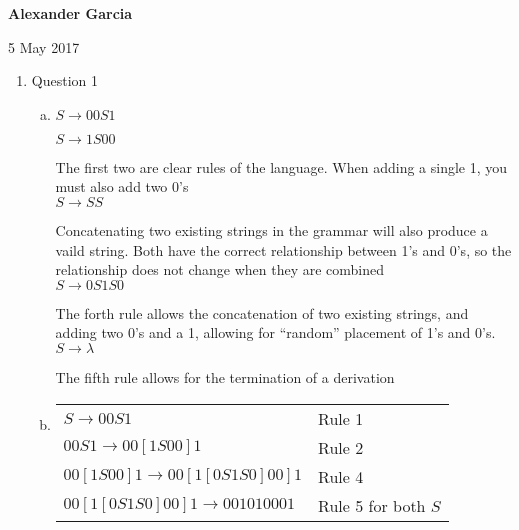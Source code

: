 \documentclass[11pt]{article}
\begin{document}
\textbf{Alexander Garcia}

5 May 2017 \\

	\begin{enumerate}

			\item Question 1

				\begin{enumerate}[(a)]

					\item

						$S \rightarrow 00S1$

						$S \rightarrow 1S00$

						The first two are clear rules of the language. When adding a single 1,
						you must also add two 0's \\

						$S \rightarrow SS$

						Concatenating two existing strings in the grammar will also produce a vaild string.
						Both have the correct relationship between 1's and 0's, so the relationship does not
						change when they are combined \\


						$S \rightarrow 0S1S0$

						The forth rule allows the concatenation of two existing strings, and adding two 0's and a 1,
						allowing for ``random'' placement of 1's and 0's. \\


						$S \rightarrow \lambda$

						The fifth rule allows for the termination of a derivation \\

					\item 	\begin{tabular}{ll}

						$S \rightarrow 00S1$ & Rule 1 \\

						$00S1 \rightarrow 00[1S00]1$ & Rule 2 \\

						$00[1S00]1 \rightarrow 00[1[0S1S0]00]1$ & Rule 4 \\

						$00[1[0S1S0]00]1 \rightarrow 001010001$ & Rule 5 for both $S$ \\

					\end{tabular}

				\end{enumerate}


\end{enumerate}
\end{document}
